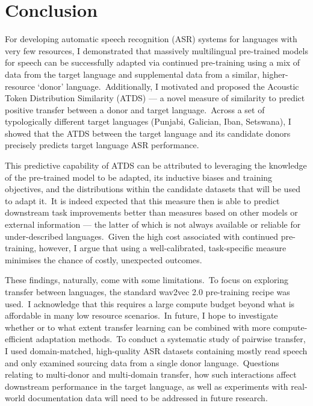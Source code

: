 \documentclass[main.tex]{subfiles}
\begin{document}
\section{Conclusion}
\label{sec:sigtyp:conc}

For developing automatic speech recognition (ASR) systems for languages with very few resources, I demonstrated that massively multilingual pre-trained models for speech can be successfully adapted via continued pre-training using a mix of data from the target language and supplemental data from a similar, higher-resource `donor' language.~Additionally, I motivated and proposed the Acoustic Token Distribution Similarity (ATDS) --- a novel measure of similarity to predict positive transfer between a donor and target language.~Across a set of typologically different target languages (Punjabi, Galician, Iban, Setswana), I showed that the ATDS between the target language and its candidate donors precisely predicts target language ASR performance.

This predictive capability of ATDS can be attributed to leveraging the knowledge of the pre-trained model to be adapted, its inductive biases and training objectives, and the distributions within the candidate datasets that will be used to adapt it.~It is indeed expected that this measure then is able to predict downstream task improvements better than measures based on other models or external information --- the latter of which is not always available or reliable for under-described languages.~Given the high cost associated with continued pre-training, however, I argue that using a well-calibrated, task-specific measure minimises the chance of costly, unexpected outcomes.

These findings, naturally, come with some limitations.~To focus on exploring transfer between languages, the standard wav2vec 2.0 pre-training recipe was used.~I acknowledge that this requires a large compute budget beyond what is affordable in many low resource scenarios.~In future, I hope to investigate whether or to what extent transfer learning can be combined with more compute-efficient adaptation methods.~To conduct a systematic study of pairwise transfer, I used domain-matched, high-quality ASR datasets containing mostly read speech and only examined sourcing data from a single donor language.~Questions relating to multi-donor and multi-domain transfer, how such interactions affect downstream performance in the target language, as well as experiments with real-world documentation data will need to be addressed in future research. 
\end{document}
